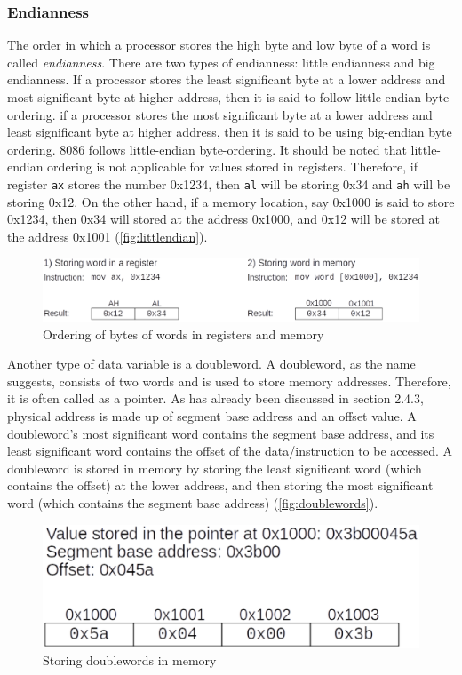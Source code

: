 \subsubsection{Endianness}
The order in which a processor stores the high byte and low byte of a word is called \textit{endianness}. There are two types of endianness: little endianness and big endianness. If a processor stores the least significant byte at a lower address and most significant byte at higher address, then it is said to follow little-endian byte ordering. if a processor stores the most significant byte at a lower address and least significant byte at higher address, then it is said to be using big-endian byte ordering. 8086 follows little-endian byte-ordering. It should be noted that little-endian ordering is not applicable for values stored in registers. Therefore, if register \verb|ax| stores the number 0x1234, then \verb|al| will be storing 0x34 and \verb|ah| will be storing 0x12. On the other hand, if a memory location, say 0x1000 is said to store 0x1234, then 0x34 will stored at the address 0x1000, and 0x12 will be stored at the address 0x1001 (\autoref{fig:littlendian}).
\begin{figure}[h]
  \centering
  \includegraphics[scale=0.25]{figures/wordendian.eps}
  \caption{Ordering of bytes of words in registers and memory}
\label{fig:littlendian}
\end{figure}
Another type of data variable is a doubleword. A doubleword, as the name suggests, consists of two words and is used to store memory addresses. Therefore, it is often called as a pointer. As has already been discussed in section 2.4.3, physical address is made up of segment base address and an offset value. A doubleword's most significant word contains the segment base address, and its least significant word contains the offset of the data/instruction to be accessed. A doubleword is stored in memory by storing the least significant word (which contains the offset) at the lower address, and then storing the most significant word (which contains the segment base address) (\autoref{fig:doublewords}).
\begin{figure}[h]
  \centering
  \includegraphics[scale=0.25]{figures/doublewords.eps}
  \caption{Storing doublewords in memory}
\label{fig:doublewords}
\end{figure}
